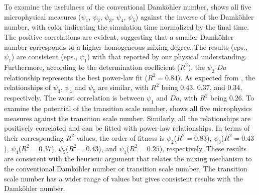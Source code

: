 \documentclass[draft,linenumbers]{agujournal}
\begin{document}
To examine the usefulness of the conventional Damk\"{o}hler number, 
 shows all five microphysical measures ($\psi_1$, $\psi_2$, $\psi_3$, $\psi_4$, $\psi_5$) against the inverse of the Damk\"{o}hler number, with color indicating the simulation time normalized by the final time. The positive correlations are evident, suggesting that a smaller Damk\"{o}hler number corresponds to a higher homogeneous mixing degree. The results (eps., $\psi_1$) are consistent (eps., $\psi_1$) with that reported by \citet{And09} our physical understanding. Furthermore, according to the determination coefficient ($R^2$), the $\psi_2$-$Da$ relationship represents the best power-law fit ($R^2 = 0.84$). As expected from , the relationships of $\psi_3$, $\psi_4$ and $\psi_5$ are similar, with $R^2$ being $0.43$, $0.37$, and $0.34$, respectively. The worst correlation is between $\psi_1$ and $Da$, with $R^2$ being $0.26$. To examine the potential of the transition scale number,  shows all five microphysics measures against the transition scale number. Similarly, all the relationships are positively correlated and can be fitted with power-law relationships. In terms of their corresponding $R^2$ values, the order of fitness is $\psi_2$($R^2 = 0.83$), $\psi_3$($R^2 = 0.43$), $\psi_4$($R^2=0.37$), $\psi_5$($R^2=0.43$), and $\psi_1$($R^2 = 0.25$), respectively. These results are consistent with the heuristic argument that relates the mixing mechanism to the conventional Damk\"{o}hler number or transition scale number. The transition scale number has a wider range of values but gives consistent results with the Damk\"ohler number.
\end{document}

